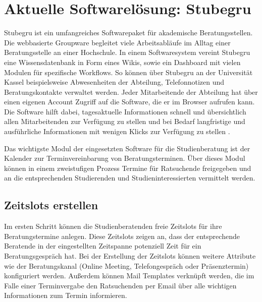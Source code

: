 \section{Aktuelle Softwarelösung: Stubegru}
Stubegru ist ein umfangreiches Softwarepaket für akademische Beratungsstellen.
Die webbasierte Groupware begleitet viele Arbeitsabläufe im Alltag einer
Beratungsstelle an einer Hochschule. In einem Softwaresystem vereint Stubegru
eine Wissensdatenbank in Form eines Wikis, sowie ein Dashboard mit vielen
Modulen für spezifische Workflows. So können über Stubegru an der Universität
Kassel beispielsweise Abwesenheiten der Abteilung, Telefonnotizen und
Beratungskontakte verwaltet werden. Jeder Mitarbeitende der Abteilung hat über
einen eigenen Account Zugriff auf die Software, die er im Browser aufrufen
kann. Die Software hilft dabei, tagesaktuelle Informationen schnell und
übersichtlich allen Mitarbeitenden zur Verfügung zu stellen und bei Bedarf
langfristige und ausführliche Informationen mit wenigen Klicks zur Verfügung zu
stellen \cite{stubegruWebsite}.

Das wichtigste Modul der eingesetzten Software für die Studienberatung ist der
Kalender zur Terminvereinbarung von Beratungsterminen. Über dieses Modul können
in einem zweistufigen Prozess Termine für Ratsuchende freigegeben und an die
entsprechenden Studierenden und Studieninteressierten vermittelt werden.

\subsection*{Zeitslots erstellen}
Im ersten Schritt können die Studienberatenden freie Zeitslots für ihre
Beratungstermine anlegen. Diese Zeitslots zeigen an, dass der entsprechende
Beratende in der eingestellten Zeitspanne potenziell Zeit für ein
Beratungsgespräch hat. Bei der Erstellung der Zeitslots können weitere
Attribute wie der Beratungskanal (Online Meeting, Telefongespräch oder
Präsenztermin) konfiguriert werden. Außerdem können Mail Templates verknüpft
werden, die im Falle einer Terminvergabe den Ratsuchenden per Email über alle
wichtigen Informationen zum Termin informieren.

